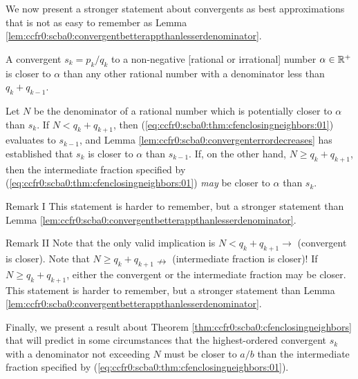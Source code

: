 We now 
present a stronger statement about convergents as best approximations that
is not as easy to remember as 
Lemma \ref{lem:ccfr0:scba0:convergentbetterappthanlesserdenominator}.

\begin{vworklemmastatement}
\label{lem:ccfr0:scba0:morecomplexconvergentbapprule}
A convergent $s_k = p_k/q_k$ to a non-negative
[rational or irrational] number
$\alpha \in {\mathbb{R}^+}$ is closer to $\alpha$
than any other rational number with a denominator 
less than $q_k + q_{k-1}$.
\end{vworklemmastatement}
\begin{vworklemmaproof}
Let $N$ be the denominator of a rational number which is
potentially closer to $\alpha$ than $s_k$.  If
$N < q_k + q_{k+1}$, then 
(\ref{eq:ccfr0:scba0:thm:cfenclosingneighbors:01})
evaluates to $s_{k-1}$, and Lemma
\ref{lem:ccfr0:scba0:convergenterrordecreases} has established that
$s_k$ is closer to $\alpha$ than $s_{k-1}$.  If, on the other
hand, $N \geq q_k + q_{k+1}$, then the intermediate fraction specified by 
(\ref{eq:ccfr0:scba0:thm:cfenclosingneighbors:01}) \emph{may} be
closer to $\alpha$ than $s_k$.
\end{vworklemmaproof}
\begin{vworklemmaparsection}{Remark I}
This statement is harder to remember, but a stronger statement
than Lemma \ref{lem:ccfr0:scba0:convergentbetterappthanlesserdenominator}.
\end{vworklemmaparsection}
\begin{vworklemmaparsection}{Remark II}
Note that the only valid implication is $N < q_k + q_{k+1} \rightarrow$
(convergent is closer).  Note that 
$N \geq q_k + q_{k+1} \nrightarrow$ (intermediate fraction is closer)!
If $N \geq q_k + q_{k+1}$, either the convergent or the intermediate fraction
may be closer.
This statement is harder to remember, but a stronger statement
than Lemma \ref{lem:ccfr0:scba0:convergentbetterappthanlesserdenominator}.
\end{vworklemmaparsection}
\vworklemmafooter{}

Finally, we present a result about Theorem
\ref{thm:ccfr0:scba0:cfenclosingneighbors} that will predict
in some circumstances that the highest-ordered convergent
$s_k$ with a denominator not exceeding $N$ must be closer
to $a/b$ than the intermediate fraction specified by
(\ref{eq:ccfr0:scba0:thm:cfenclosingneighbors:01}).


